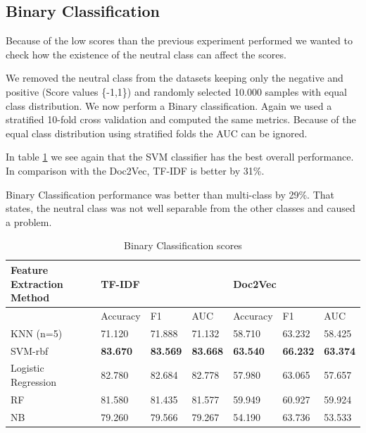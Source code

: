 \documentclass{article}
\begin{document}
\subsection{Binary Classification}
\label{binary}
Because of the low scores than the previous experiment performed we wanted to check how
the existence of the neutral class can affect the scores.

We removed the neutral class from the datasets keeping only
the negative and positive (Score values \{-1,1\}) and randomly selected 10.000 samples with
equal class distribution. We now perform a Binary classification. Again we used a stratified
10-fold cross validation and computed the same metrics. Because of the equal class distribution 
using stratified folds the AUC can be ignored.

In table \ref{binscore} we see again that the SVM classifier has the best overall performance.
In comparison with the Doc2Vec, TF-IDF is better by 31\%.

Binary Classification performance was better than multi-class by 29\%. That states, the 
neutral class was not well separable from the other classes and caused a problem.

\begin{table}[h]
  \begin{tabular}{lllllll}
  \hline
  Feature Extraction Method & \multicolumn{3}{l}{TF-IDF}                          & \multicolumn{3}{l}{Doc2Vec}                         \\ \hline
                            & Accuracy        & F1              & AUC             & Accuracy        & F1              & AUC             \\ \hline
  KNN (n=5)                 & 71.120          & 71.888          & 71.132          & 58.710          & 63.232          & 58.425          \\
  SVM-rbf                   & \textbf{83.670} & \textbf{83.569} & \textbf{83.668} & \textbf{63.540} & \textbf{66.232} & \textbf{63.374} \\
  Logistic Regression       & 82.780          & 82.684          & 82.778          & 57.980          & 63.065          & 57.657          \\
  RF                        & 81.580          & 81.435          & 81.577          & 59.949          & 60.927          & 59.924          \\
  NB                        & 79.260          & 79.566          & 79.267          & 54.190          & 63.736          & 53.533          \\ \hline
  \end{tabular}
  \caption{Binary Classification scores}
  \label{binscore}
\end{table}
  
\end{document}
